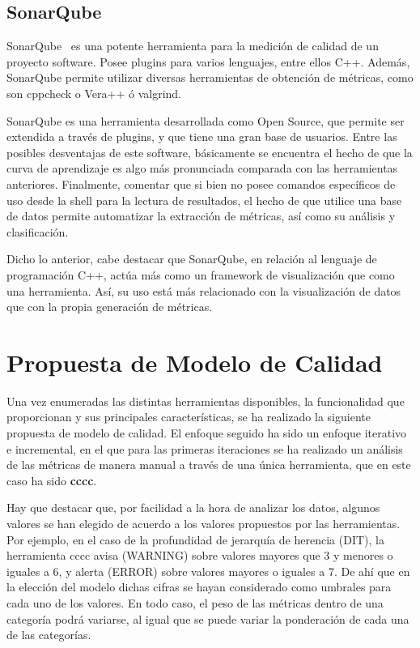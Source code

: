 \documentclass[11pt]{article}
\begin{document}
\subsection{SonarQube}

SonarQube~\cite{metrictools:sonarqube} es una potente herramienta para la medición de calidad de un proyecto software. Posee plugins para varios lenguajes, entre ellos C++. Además, SonarQube permite utilizar diversas herramientas de obtención de métricas, como son cppcheck o Vera++ ó valgrind.

SonarQube es una herramienta desarrollada como Open Source, que permite ser extendida a través de plugins, y que tiene una gran base de usuarios. Entre las posibles desventajas de este software, básicamente se encuentra el hecho de que la curva de aprendizaje es algo más pronunciada comparada con las herramientas anteriores. Finalmente, comentar que si bien no posee comandos específicos de uso desde la shell para la lectura de resultados, el hecho de que utilice una base de datos permite automatizar la extracción de métricas, así como su análisis y clasificación.

Dicho lo anterior, cabe destacar que SonarQube, en relación al lenguaje de programación C++, actúa más como un framework de visualización que como una herramienta. Así, su uso está más relacionado con la visualización de datos que con la propia generación de métricas.

\section{Propuesta de Modelo de Calidad}

Una vez enumeradas las distintas herramientas disponibles, la funcionalidad que proporcionan y sus principales características, se ha realizado la siguiente propuesta de modelo de calidad. El enfoque seguido ha sido un enfoque iterativo e incremental, en el que para las primeras iteraciones se ha realizado un análisis de las métricas de manera manual a través de una única herramienta, que en este caso ha sido \textbf{cccc}.

Hay que destacar que, por facilidad a la hora de analizar los datos, algunos valores se han elegido de acuerdo a los valores propuestos por las herramientas. Por ejemplo, en el caso de la profundidad de jerarquía de herencia (DIT), la herramienta cccc avisa (WARNING) sobre valores mayores que 3 y menores o iguales a 6, y alerta (ERROR) sobre valores mayores o iguales a 7. De ahí que en la elección del modelo dichas cifras se hayan considerado como umbrales para cada uno de los valores. En todo caso, el peso de las métricas dentro de una categoría podrá variarse, al igual que se puede variar la ponderación de cada una de las categorías.
\end{document}
